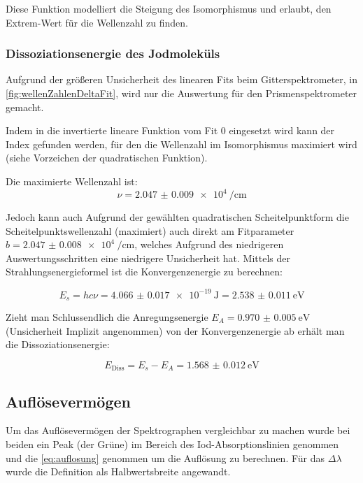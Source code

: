 \documentclass[12pt,english,ngerman]{scrartcl}
\begin{document}
Diese Funktion modelliert die Steigung des Isomorphismus und erlaubt, den
Extrem-Wert für die Wellenzahl zu finden.

\subsubsection{Dissoziationsenergie des Jodmoleküls}
Aufgrund der größeren Unsicherheit des linearen Fits beim Gitterspektrometer,
in \autoref{fig:wellenZahlenDeltaFit}, wird nur die Auswertung für den
Prismenspektrometer gemacht.

Indem in die invertierte lineare Funktion vom Fit 0 eingesetzt wird kann der
Index gefunden werden, für den die Wellenzahl im Isomorphismus maximiert wird
(siehe Vorzeichen der quadratischen Funktion). 

Die maximierte Wellenzahl ist:
\begin{equation}
	\nu = \SI{2.047(9)e4}{\per\cm}
\end{equation}

Jedoch kann auch Aufgrund der gewählten quadratischen Scheitelpunktform die
Scheitelpunktswellenzahl (maximiert) auch direkt am Fitparameter $b =
	\SI{2.047(8)e4}{\per\cm}$, welches Aufgrund des niedrigeren
Auswertungsschritten eine niedrigere Unsicherheit hat. Mittels der
Strahlungsenergieformel ist die Konvergenzenergie zu berechnen:

\begin{equation}
	E_s = h c \nu = \SI{4.066(17)e-19}{\joule} = \SI{2.538(11)}{\electronvolt}
\end{equation}

Zieht man Schlussendlich die Anregungsenergie
$E_A=\SI{0.970(5)}{\electronvolt}$ (Unsicherheit Implizit angenommen) von der
Konvergenzenergie ab erhält man die Dissoziationsenergie:

\begin{equation}
	E_\text{Diss} = E_s - E_A = \SI{1.568(12)}{\electronvolt}
\end{equation}

\subsection{Auflösevermögen}

Um das Auflösevermögen der Spektrographen vergleichbar zu machen wurde bei
beiden ein Peak (der Grüne) im Bereich des Iod-Absorptionslinien genommen und
die \autoref{eq:auflosung} genommen um die Auflösung zu berechnen. Für das
$\Delta \lambda$ wurde die Definition als Halbwertsbreite angewandt.
\end{document}
